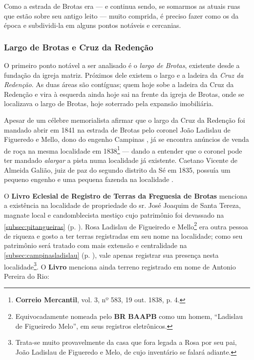 Como a estrada de Brotas era --- e continua sendo, se somarmos as atuais ruas que estão sobre seu antigo leito --- muito comprida, é preciso fazer como os da época e subdividi-la em alguns pontos notáveis e cercanias.

\subsubsection{Largo de Brotas e Cruz da Redenção}\label{subsubsec:brotasredencao}

O primeiro ponto notável a ser analisado é o \textit{largo de Brotas}, existente desde a fundação da igreja matriz. Próximos dele existem o largo e a ladeira da \textit{Cruz da Redenção}. As duas áreas são contíguas; quem hoje sobe a ladeira da Cruz da Redenção e vira à esquerda ainda hoje sai na frente da igreja de Brotas, onde se localizava o largo de Brotas, hoje soterrado pela expansão imobiliária.

Apesar de um célebre memorialista afirmar que o largo da Cruz da Redenção foi mandado abrir em 1841 na estrada de Brotas pelo coronel João Ladislau de Figueredo e Mello, dono do engenho Campinas \cite[p.~88]{campos_brotas_1942}, já se encontra anúncios de venda de roça na mesma localidade em 1838\footnote{\textbf{Correio Mercantil}, vol. 3, nº 583, 19 out. 1838, p. 4.} --- dando a entender que o coronel pode ter mandado \textit{alargar} a pista numa localidade já existente. Caetano Vicente de Almeida Galião, juiz de paz do segundo distrito da Sé em 1835, possuía um pequeno engenho e uma pequena fazenda na localidade \cite[p.~239]{REIS2004males}.

O \textbf{Livro Eclesial de Registro de Terras da Freguesia de Brotas} menciona a existência na localidade de propriedade do sr. José Joaquim de Santa Tereza, magnate local e candomblecista mestiço cujo patrimônio foi devassado na \autoref{subsec:pitangueiras} (p. \pageref{subsec:pitangueiras}). Rosa Ladislau de Figueiredo e Mello\footnote{Equivocadamente nomeada pelo \textbf{BR BAAPB} como um homem, ``Ladislau de Figueiredo Melo'', em seus registros eletrônicos.} era outra pessoa de riqueza e gosto a ter terras registradas em seu nome na localidade; como seu patrimônio será tratado com mais extensão e centralidade na \autoref{subsec:campinasladislau} (p. \pageref{subsec:campinasladislau}), vale apenas registrar sua presença nesta localidade\footnote{Trata-se muito provavelmente da casa que fora legada a Rosa por seu pai, João Ladislau de Figueredo e Melo, de cujo inventário se falará adiante.}. O \textbf{Livro} menciona ainda terreno registrado em nome de Antonio Pereira do Rio:

